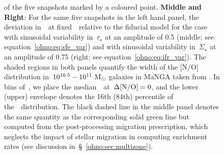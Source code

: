 \begin{figure}
{of the five snapshots marked by a coloured point.
\textbf{Middle and Right}: For the same five snapshots in the left hand panel,
the deviation in~\no~at fixed~\oh~relative to the fiducial model for the case
with sinusoidal variability in~$\tau_\star$ at an amplitude of 0.5 (middle; see
equation~\ref{ohno:eq:sfe_var})
and with sinusoidal variability in~$\dot{\Sigma}_\star$ at an amplitude of 0.75
(right; see equation~\ref{ohno:eq:ifr_var}).
The shaded regions in both panels quantify the width of the [N/O] distribution
in~$10^{10.5} - 10^{11}~\text{M}_\odot$ galaxies in MaNGA taken from
\citet{Schaefer2020}.
In bins of~\oh, we place the median~\no~at~$\Delta\text{[N/O]} = 0$, and the lower
(upper) envelope denotes the 16th (84th) percentile of the~\no~distribution.
The black dashed line in the middle panel denotes the same quantity as the
corresponding solid green line but computed from the post-processing migration
prescription, which neglects the impact of stellar migration in computing
enrichment rates (see discussion in~\S~\ref{ohno:sec:multizone}).
}
\label{ohno:fig:schaefer_comp}
\end{figure}

